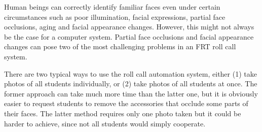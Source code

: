 Human beings can correctly identify familiar faces even under certain circumstances such as poor illumination,
facial expressions, partial face occlusions, aging and facial appearance changes. However, this might not always
be the case for a computer system. Partial face occlusions and facial appearance changes can pose two of the most
challenging problems in an FRT roll call system.

There are two typical ways to use the roll call automation system, either (1) take photos of all students individually,
or (2) take photos of all students at once. The former approach can take much more time than the latter one, but it
is obviously easier to request students to remove the accessories that occlude some parts of their faces. The latter
method requires only one photo taken but it could be harder to achieve, since not all students would simply cooperate.
